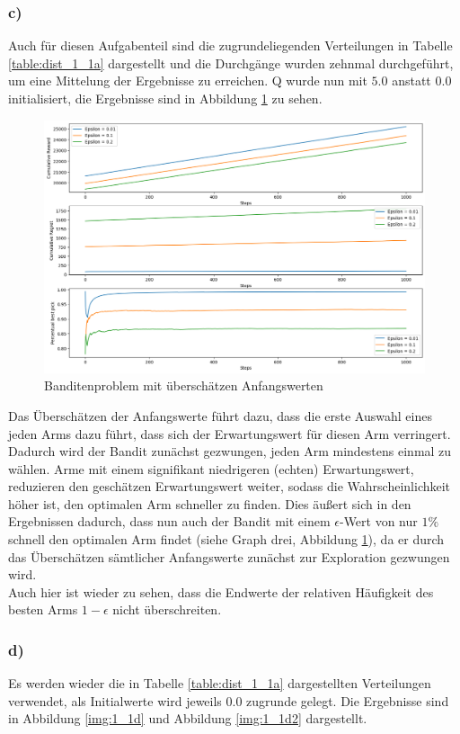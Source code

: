 \documentclass[11pt]{article}
\begin{document}
\subsubsection*{c)}
Auch für diesen Aufgabenteil sind die zugrundeliegenden Verteilungen in Tabelle \ref{table:dist_1_1a} dargestellt und die Durchgänge wurden zehnmal durchgeführt, um eine Mittelung der Ergebnisse zu erreichen. Q wurde nun mit $5.0$ anstatt $0.0$ initialisiert, die Ergebnisse sind in Abbildung \ref{img:1_1c} zu sehen.
\begin{figure}[h]
    \centering
    \includegraphics[width=\textwidth]{img/1_1c.png}
    \caption{Banditenproblem mit überschätzen Anfangswerten}
    \label{img:1_1c}
\end{figure} 
Das Überschätzen der Anfangswerte führt dazu, dass die erste Auswahl eines jeden Arms dazu führt, dass sich der Erwartungswert für diesen Arm verringert. Dadurch wird der Bandit zunächst gezwungen, jeden Arm mindestens einmal zu wählen. Arme mit einem signifikant niedrigeren (echten) Erwartungswert, reduzieren den geschätzen Erwartungswert weiter, sodass die Wahrscheinlichkeit höher ist, den optimalen Arm schneller zu finden. Dies äußert sich in den Ergebnissen dadurch, dass nun auch der Bandit mit einem $\epsilon$-Wert von nur $1\%$ schnell den optimalen Arm findet (siehe Graph drei, Abbildung \ref{img:1_1c}), da er durch das Überschätzen sämtlicher Anfangswerte zunächst zur Exploration gezwungen wird.\\
Auch hier ist wieder zu sehen, dass die Endwerte der relativen Häufigkeit des besten Arms $1-\epsilon$ nicht überschreiten. 

\subsubsection*{d)}
Es werden wieder die in Tabelle \ref{table:dist_1_1a} dargestellten Verteilungen verwendet, als Initialwerte wird jeweils $0.0$ zugrunde gelegt. Die Ergebnisse sind in Abbildung \ref{img:1_1d} und Abbildung \ref{img:1_1d2} dargestellt.
\end{document}
